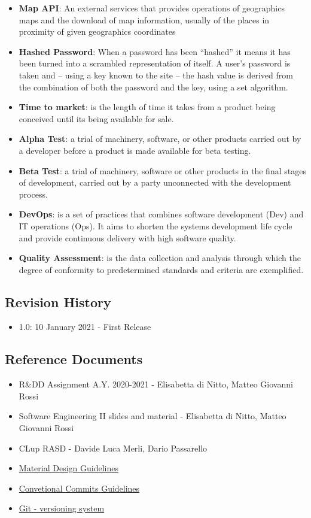 \begin{itemize}
    \item \textbf{Map API}: An external services that provides operations of geographics maps and the download of map information, usually of the places in proximity of given geographics coordinates
    \item \textbf{Hashed Password}: When a password has been “hashed” it means it has been turned into a scrambled representation of itself. A user's password is taken and – using a key known to the site – the hash value is derived from the combination of both the password and the key, using a set algorithm.
    \item \textbf{Time to market}: is the length of time it takes from a product being conceived until its being available for sale.
    \item \textbf{Alpha Test}: a trial of machinery, software, or other products carried out by a developer before a product is made available for beta testing.
    \item \textbf{Beta Test}: a trial of machinery, software or other products in the final stages of development, carried out by a party unconnected with the development process.
    \item \textbf{DevOps}: is a set of practices that combines software development (Dev) and IT operations (Ops). It aims to shorten the systems development life cycle and provide continuous delivery with high software quality.
    \item \textbf{Quality Assessment}: is the data collection and analysis through which the degree of conformity to predetermined standards and criteria are exemplified.
\end{itemize}

\subsection{Revision History}

\begin{itemize}
    \item 1.0: 10 January 2021 - First Release
\end{itemize}

\subsection{Reference Documents}

\begin{itemize}
    \item R\&DD Assignment A.Y. 2020-2021 - Elisabetta di Nitto, Matteo Giovanni Rossi
    \item Software Engineering II slides and material - Elisabetta di Nitto, Matteo Giovanni Rossi
    \item CLup RASD - Davide Luca Merli, Dario Passarello
    \item \href{https://material.io/design}{Material Design Guidelines}
    \item \href{https://www.conventionalcommits.org/en/v1.0.0/}{Convetional Commits Guidelines}
    \item \href{https://git-scm.com/}{Git - versioning system}
\end{itemize}

